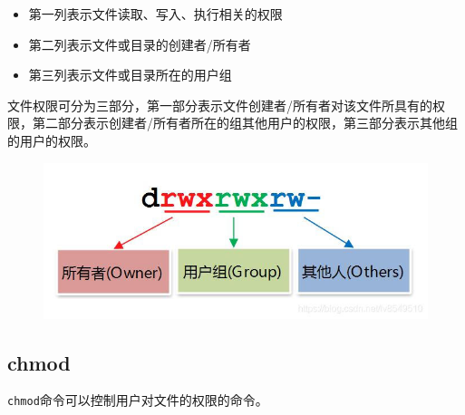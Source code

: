\documentclass[12pt, openany, oneside]{book}
\begin{document}
\begin{itemize}
    \item 第一列表示文件读取、写入、执行相关的权限

    \item 第二列表示文件或目录的创建者/所有者

    \item 第三列表示文件或目录所在的用户组
\end{itemize}

文件权限可分为三部分，第一部分表示文件创建者/所有者对该文件所具有的权限，第二部分表示创建者/所有者所在的组其他用户的权限，第三部分表示其他组的用户的权限。 \\

\begin{table}[H]
    \centering
    \caption{文件权限}
\end{table}

\begin{figure}[H]
    \centering
    \includegraphics[scale=0.7]{img/C5/5-2/2.png}
\end{figure}

\subsection{chmod}

\lstinline|chmod|命令可以控制用户对文件的权限的命令。
\end{document}

